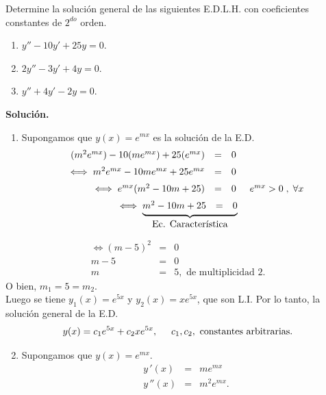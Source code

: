 \documentclass{beamer}
\begin{document}
\begin{frame}[t]
	\begin{example}
		Determine la solución general de las siguientes E.D.L.H. con coeficientes constantes de \(2^{do}\) orden.
		\begin{enumerate}
			\item \(y'' -10y' +25y=0\).
			\item \(2y'' -3y' +4y=0\).
			\item \(y'' +4y' -2y=0\).
		\end{enumerate}
		\textbf{Solución.} \begin{enumerate}
			\item Supongamos que \(y(x) = e^{mx}\) es la solución de la E.D. 
				\[
					\begin{array}{rcl}
						(m^2e^{mx}) - 10(me^{{mx}}) + 25(e^{mx}) & = & 0 \\[2mm]
						\iff m^2e^{mx} - 10m e^{mx} + 25e^{mx} & = & 0 \\[2mm]
						\iff e^{mx} (m^2-10m+25) & = & 0 \hspace{5mm} e^{mx} >0 \;,\; \forall x\\[2mm]
						\iff \underbrace{\begin{matrix} m^2-10m+25 & = & 0 \end{matrix}} _{\mbox{Ec. Característica}} \hspace{-12mm}
					\end{array}
				\]
		\end{enumerate}
	\end{example}
\end{frame}
\begin{frame}[t]
	\begin{exampleblock}{}
		\[
			\begin{array}{rcl}
				\iff (m-5) ^2 & = & 0 \\[2mm]
				m-5 & = & 0 \\[2mm]
				m & = & 5, \mbox{ de multiplicidad } 2.
			\end{array}
		\]
		O bien, \(m_1=5=m_2\). \\[2mm]
		Luego se tiene \(y_1(x) = e^{5x}\) y \(y_2(x) = xe^{5x}\), que son L.I. Por lo tanto, la solución general de la E.D. 
		\[
			y(x) = c_1e^{5x} + c_2xe^{5x} , \hspace{5mm} c_1,c_2, \mbox{ constantes arbitrarias.} 
		\]
		\begin{enumerate}
			\setcounter{enumi}{1}
		\item Supongamos que \(y(x) = e^{mx}\).
			\[
				\begin{array}{rcl}
					y\,' (x) & = & me^{mx} \\[2mm]
					y\,'' (x) & = & m^2e^{mx} .
				\end{array}
			\]
		\end{enumerate}
	\end{exampleblock}
\end{frame}
\end{document}
